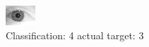 \begin{figure}[h!]
\begin{center}
\includegraphics[width=0.60\columnwidth]{figures/ID2079_class_4_target_3.png}
\end{center}
\caption{ Classification: 4 actual target: 3}
\label{fig:ID2079_class_4_target_3}
\end{figure}
